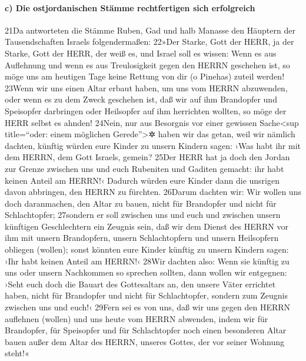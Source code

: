 \hypertarget{c-die-ostjordanischen-stuxe4mme-rechtfertigen-sich-erfolgreich}{%
\paragraph{c) Die ostjordanischen Stämme rechtfertigen sich
erfolgreich}\label{c-die-ostjordanischen-stuxe4mme-rechtfertigen-sich-erfolgreich}}

21Da antworteten die Stämme Ruben, Gad und halb Manasse den Häuptern der
Tausendschaften Israels folgendermaßen: 22»Der Starke, Gott der HERR, ja
der Starke, Gott der HERR, der weiß es, und Israel soll es wissen: Wenn
es aus Auflehnung und wenn es aus Treulosigkeit gegen den HERRN
geschehen ist, so möge uns am heutigen Tage keine Rettung von dir (o
Pinehas) zuteil werden! 23Wenn wir uns einen Altar erbaut haben, um uns
vom HERRN abzuwenden, oder wenn es zu dem Zweck geschehen ist, daß wir
auf ihm Brandopfer und Speisopfer darbringen oder Heilsopfer auf ihm
herrichten wollten, so möge der HERR selbst es ahnden! 24Nein, nur aus
Besorgnis vor einer gewissen Sache\textless sup title=``oder: einem
möglichen Gerede''\textgreater✲ haben wir das getan, weil wir nämlich
dachten, künftig würden eure Kinder zu unsern Kindern sagen: ›Was habt
ihr mit dem HERRN, dem Gott Israels, gemein? 25Der HERR hat ja doch den
Jordan zur Grenze zwischen uns und euch Rubeniten und Gaditen gemacht:
ihr habt keinen Anteil am HERRN!‹ Dadurch würden eure Kinder dann die
unsrigen davon abbringen, den HERRN zu fürchten. 26Darum dachten wir:
Wir wollen uns doch daranmachen, den Altar zu bauen, nicht für
Brandopfer und nicht für Schlachtopfer; 27sondern er soll zwischen uns
und euch und zwischen unsern künftigen Geschlechtern ein Zeugnis sein,
daß wir dem Dienst des HERRN vor ihm mit unsern Brandopfern, unsern
Schlachtopfern und unsern Heilsopfern obliegen (wollen); sonst könnten
eure Kinder künftig zu unsern Kindern sagen: ›Ihr habt keinen Anteil am
HERRN!‹ 28Wir dachten also: Wenn sie künftig zu uns oder unsern
Nachkommen so sprechen sollten, dann wollen wir entgegnen: ›Seht euch
doch die Bauart des Gottesaltars an, den unsere Väter errichtet haben,
nicht für Brandopfer und nicht für Schlachtopfer, sondern zum Zeugnis
zwischen uns und euch!‹ 29Fern sei es von uns, daß wir uns gegen den
HERRN auflehnen (wollen) und uns heute vom HERRN abwenden, indem wir für
Brandopfer, für Speisopfer und für Schlachtopfer noch einen besonderen
Altar bauen außer dem Altar des HERRN, unseres Gottes, der vor seiner
Wohnung steht!«

